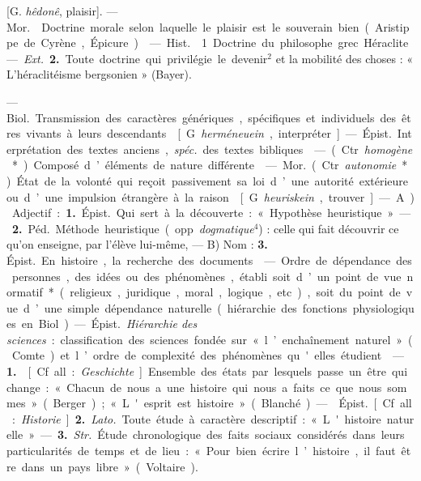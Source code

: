 \begin{itemize}[leftmargin=1cm, label=, itemsep=1pt]
 [G. {\it hêdonê}, plaisir]. — \si{Mor.} 
Doctrine morale selon laquelle le plaisir est le souverain bien
(Aristippe de Cyrène, Épicure).

 — \si{Hist.} 1. Doctrine du philosophe grec
Héraclite. — {\it Ext.} {\bf 2.} Toute doctrine qui privilégie le devenir$^2$
et la mobilité des choses : « L’héraclitéisme bergsonien » (Bayer).

 — \si{Biol.} Transmission des caractères génériques,
spécifiques et individuels des êtres vivants à leurs descendants.

 [G. {\it herméneuein}, interpréter]. — \si{Épist.}
Interprétation des textes anciens, {\it spéc.} des textes bibliques.

 — (Ctr. {\it homogène}*).
Composé d’éléments de nature différente.

 — \si{Mor.} (Ctr. {\it autonomie}*). État de la volonté qui
reçoit passivement sa loi d’une autorité extérieure ou d’une impulsion
étrangère à la raison.

 [G. {\it heuriskein}, trouver].
— A) Adjectif : {\bf 1.} \si{Épist.} Qui sert à
la découverte : « Hypothèse heuristique ». — {\bf 2.} \si{Péd.} Méthode
heuristique (opp. {\it dogmatique}$^4$) : celle qui fait découvrir ce qu’on
enseigne, par l'élève lui-même, — B) Nom : {\bf 3.} \si{Épist.} En histoire,
la recherche des documents.

 — Ordre de dépendance des personnes, des idées ou des
phénomènes, établi soit d’un point de vue normatif* (religieux, juridique,
moral, logique, etc.), soit du point de vue d’une simple dépendance naturelle
(hiérarchie des fonctions physiologiques en Biol). — \si{Épist.}
{\it Hiérarchie des sciences} : classification des sciences fondée sur
« l’enchaînement naturel » (Comte) et l’ordre de complexité des phénomènes
qu'elles étudient.

 — {\bf 1.}  [Cf. all. : {\it Geschichte}]
Ensemble des états par lesquels passe un être qui change : « Chacun de nous a
une histoire qui nous a faits ce que nous sommes » (Berger) ; « L'esprit est
histoire » (Blanché). —  \si{Épist.} [Cf. all. :
{\it Historie}]. {\bf 2.} {\it Lato.} Toute étude à caractère descriptif :
« L'histoire naturelle ». — {\bf 3.} {\it Str.} Étude chronologique des faits
sociaux considérés dans leurs particularités de temps et de lieu : « Pour
bien écrire l’histoire, il faut être dans un pays libre » (Voltaire).


\end{itemize}
